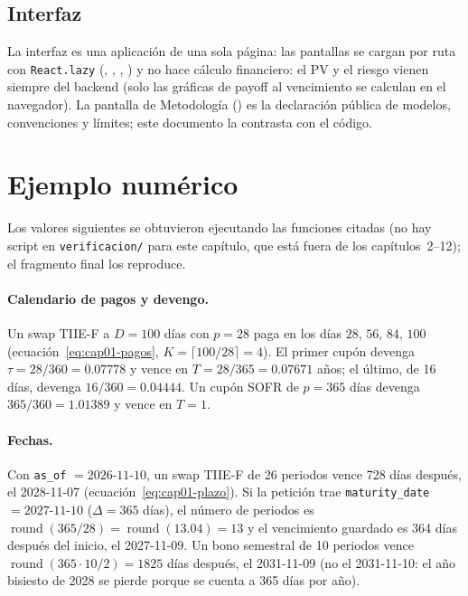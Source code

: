 \begin{sloppypar}
\subsection{Interfaz}\label{sec:cap01-interfaz}

La interfaz es una aplicación de una sola página: las pantallas se cargan por ruta con \texttt{React.lazy}
(, ,
, ) y no hace cálculo
financiero: el PV y el riesgo vienen siempre del backend (solo las gráficas de payoff al vencimiento se
calculan en el navegador). La pantalla de Metodología
() es la declaración pública de modelos,
convenciones y límites; este documento la contrasta con el código.

\section{Ejemplo numérico}\label{sec:cap01-ejemplo}

Los valores siguientes se obtuvieron ejecutando las funciones citadas (no hay script en \texttt{verificacion/}
para este capítulo, que está fuera de los capítulos~2--12); el fragmento final los reproduce.

\paragraph{Calendario de pagos y devengo.} Un swap TIIE-F a $D=100$ días con $p=28$ paga en los días
$28,\,56,\,84,\,100$ (ecuación~\eqref{eq:cap01-pagos}, $K=\lceil 100/28\rceil=4$). El primer cupón devenga
$\tau=28/360=0.07778$ y vence en $T=28/365=0.07671$ años; el último, de 16 días, devenga $16/360=0.04444$.
Un cupón SOFR de $p=365$ días devenga $365/360=1.01389$ y vence en $T=1$.

\paragraph{Fechas.} Con \texttt{as\_of} $=2026\text{-}11\text{-}10$, un swap TIIE-F de 26 periodos vence 728
días después, el 2028-11-07 (ecuación~\eqref{eq:cap01-plazo}). Si la petición trae
\texttt{maturity\_date} $=2027\text{-}11\text{-}10$ ($\Delta=365$ días), el número de periodos es
$\operatorname{round}(365/28)=\operatorname{round}(13.04)=13$ y el vencimiento guardado es 364 días después
del inicio, el 2027-11-09. Un bono semestral de 10 periodos vence $\operatorname{round}(365\cdot10/2)=1825$ días
después, el 2031-11-09 (no el 2031-11-10: el año bisiesto de 2028 se pierde porque se cuenta a 365 días por año).


\end{sloppypar}
